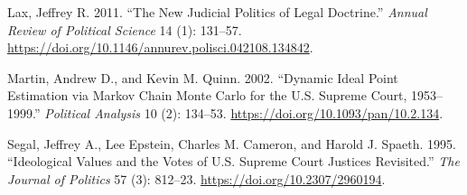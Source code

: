 \documentclass[
  11pt,
]{article}
\newlength{\cslhangindent}
\newenvironment{CSLReferences}[2] %
 {%
  \setlength{\parindent}{0pt}
  \ifodd #1 \everypar{\setlength{\hangindent}{\cslhangindent}}\ignorespaces\fi
  \ifnum #2 > 0
  \setlength{\parskip}{#2\baselineskip}
  \fi
 }%
 {}
\begin{document}
\begin{CSLReferences}{1}{0}
\leavevmode{}%
Lax, Jeffrey R. 2011. {``The {New Judicial Politics} of {Legal
Doctrine}.''} \emph{Annual Review of Political Science} 14 (1): 131--57.
\url{https://doi.org/10.1146/annurev.polisci.042108.134842}.

\leavevmode{}%
Martin, Andrew D., and Kevin M. Quinn. 2002. {``Dynamic {Ideal Point
Estimation} via {Markov Chain Monte Carlo} for the {U}.{S}. {Supreme
Court}, 1953--1999.''} \emph{Political Analysis} 10 (2): 134--53.
\url{https://doi.org/10.1093/pan/10.2.134}.

\leavevmode{}%
Segal, Jeffrey A., Lee Epstein, Charles M. Cameron, and Harold J.
Spaeth. 1995. {``Ideological {Values} and the {Votes} of {U}.{S}.
{Supreme Court Justices Revisited}.''} \emph{The Journal of Politics} 57
(3): 812--23. \url{https://doi.org/10.2307/2960194}.

\end{CSLReferences}
\end{document}
